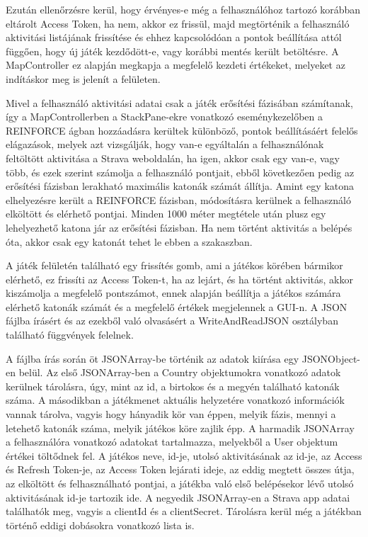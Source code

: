Ezután ellenőrzésre kerül, hogy érvényes-e még a felhasználóhoz tartozó korábban eltárolt Access Token, ha nem, akkor ez frissül, majd megtörténik a felhasználó aktivitási listájának frissítése és ehhez kapcsolódóan a pontok beállítása attól függően, hogy új játék kezdődött-e, vagy korábbi mentés került betöltésre. A MapController ez alapján megkapja a megfelelő kezdeti értékeket, melyeket az indításkor meg is jelenít a felületen. 

Mivel a felhasználó aktivitási adatai csak a játék erősítési fázisában számítanak, így a MapControllerben a StackPane-ekre vonatkozó eseménykezelőben a REINFORCE ágban hozzáadásra kerültek különböző, pontok beállításáért felelős elágazások, melyek azt vizsgálják, hogy van-e egyáltalán a felhasználónak feltöltött aktivitása a Strava weboldalán, ha igen, akkor csak egy van-e, vagy több, és ezek szerint számolja a felhasználó pontjait, ebből következően pedig az erősítési fázisban lerakható maximális katonák számát állítja. Amint egy katona elhelyezésre került a REINFORCE fázisban, módosításra kerülnek a felhasználó elköltött és elérhető pontjai. Minden 1000 méter megtétele után plusz egy lehelyezhető katona jár az erősítési fázisban. Ha nem történt aktivitás a belépés óta, akkor csak egy katonát tehet le ebben a szakaszban. 

A játék felületén található egy frissítés gomb, ami a játékos körében bármikor elérhető, ez frissíti az Access Token-t, ha az lejárt, és ha történt aktivitás, akkor kiszámolja a megfelelő pontszámot, ennek alapján beállítja a játékos számára elérhető katonák számát és a megfelelő értékek megjelennek a GUI-n. A JSON fájlba írásért és az ezekből való olvasásért a WriteAndReadJSON osztályban található függvények felelnek. 

A fájlba írás során öt JSONArray-be történik az adatok kiírása egy JSONObject-en belül. Az első JSONArray-ben a Country objektumokra vonatkozó adatok kerülnek tárolásra, úgy, mint az id, a birtokos és a megyén található katonák száma. A másodikban a játékmenet aktuális helyzetére vonatkozó információk vannak tárolva, vagyis hogy hányadik kör van éppen, melyik fázis, mennyi a letehető katonák száma, melyik játékos köre zajlik épp. A harmadik JSONArray a felhasználóra vonatkozó adatokat tartalmazza, melyekből a User objektum értékei töltődnek fel. A játékos neve, id-je, utolsó aktivitásának az id-je, az Access és Refresh Token-je, az Access Token lejárati ideje, az eddig megtett összes útja, az elköltött és felhasználható pontjai, a játékba való első belépésekor lévő utolsó aktivitásának id-je tartozik ide. A negyedik JSONArray-en a Strava app adatai találhatók meg, vagyis a clientId és a clientSecret. Tárolásra kerül még a játékban történő eddigi dobásokra vonatkozó lista is. 

